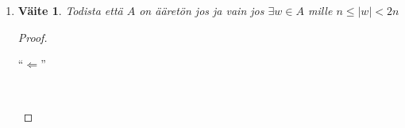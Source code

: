 \documentclass[a4paper,11pt,draft]{article}
\newtheorem*{claim}{Väite}
\begin{document}
\begin{enumerate}
\begin{enumerate}
\begin{proof}
\begin{description}
\begin{enumerate}
            FIXME kuva silmukasta

            Erityisesti
            \begin{alignat*}{3}
              & \delta(q_{i-1}, w_{i-1}) && = q_i && = q_j \\
              \textrm{ja}\quad & \delta(q_i, u_j) && = \delta(q_j, u_j) && = q_{j+1}
            \end{alignat*}
            Tällöin merkkijono
            \begin{equation*}
              v = w_1 \ldots w_{i-1}w_j \ldots w_k
            \end{equation*}
            kulkee tilajonon
            \begin{equation*}
              \bar{p} = q_1 \ldots q_iq_{j+1} \ldots q_{k+1}
            \end{equation*}
            läpi. Koska tilajonoissa $\bar{q}$ ja $\bar{p}$ on sama
            viimeinen tila $q_{k+1} \in F$, hyväksyy automaatti $M$
            myös merkkijonon $v$. Lisäksi $|v| \le |u| - 1$, eli
            merkkinono lyhenee ainakin yhden merkin verran.
            Toistamalla tätä menetelmää korkeintaan $(k - n) + 1$
            kertaa, löydetään automaatin $M$ hyväksymä merkkijono $u$,
            jolla merkkijono lyhenee ainakin $(k - n) + 1$ merkin
            verran.
            \begin{align*}
              |u| &\le |u| - ((k - n) + 1) \\
              &= k - k + n -1 \\
              &= n - 1 \\ 
              &< n
            \end{align*}
            Siis $|u| < n$ ja täten merkkijono $u$ toteuttaa halutun
            ehdon.
          \end{enumerate}
      \end{description}
    \end{proof}
  \item
    \begin{claim}
      Todista että $A$ on ääretön jos ja vain jos $\exists w \in A$
      mille $n \le |w| < 2n$
    \end{claim}
    \begin{proof} \hfill \\
      \begin{description}
        \item[``$\Leftarrow$''] \hfill \\

\end{description}
\end{proof}
\end{enumerate}
\end{enumerate}
\end{document}
